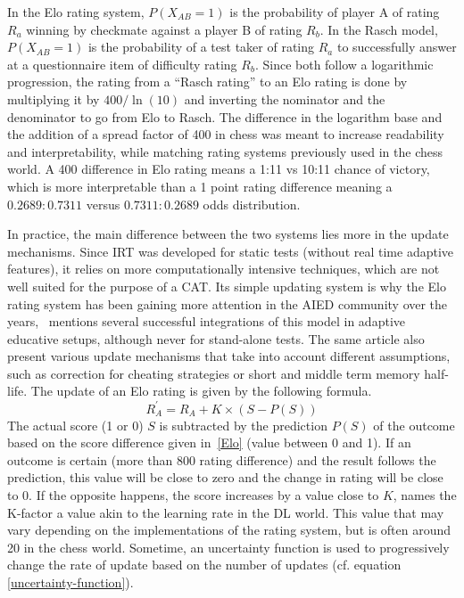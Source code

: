 In the Elo rating system, $P(X_{AB} = 1)$ is the probability of player A of rating $R_a$ winning by checkmate against a player B of rating $R_b$. In the Rasch model, $P(X_{AB} = 1)$ is the probability of a test taker of rating $R_a$ to successfully answer at a questionnaire item of difficulty rating $R_b$. Since both follow a logarithmic progression, the rating from a ``Rasch rating'' to an Elo rating is done by multiplying it by $400/\ln(10)$ and inverting the nominator and the denominator to go from Elo to Rasch. The difference in the logarithm base and the addition of a spread factor of 400 in chess was meant to increase readability and interpretability, while matching rating systems previously used in the chess world. A 400 difference in Elo rating means a 1:11 vs 10:11 chance of victory, which is more interpretable than a 1 point rating difference meaning a $0.2689:0.7311$ versus $0.7311:0.2689$ odds distribution.

In practice, the main difference between the two systems lies more in the update mechanisms. Since IRT was developed for static tests (without real time adaptive features), it relies on more computationally intensive techniques, which are not well suited for the purpose of a CAT\@. Its simple updating system is why the Elo rating system has been gaining more attention in the AIED community over the years,\ \cite{pelanek_applications_2016} mentions several successful integrations of this model in adaptive educative setups, although never for stand-alone tests. The same article also present various update mechanisms that take into account different assumptions, such as correction for cheating strategies or short and middle term memory half-life. The update of an Elo rating is given by the following formula.
\begin{equation}
    R_{A}^{\prime}= R_A+K \times{(S-P(S))}
    \label{Update Elo}
\end{equation}
The actual score (1 or 0) $S$ is subtracted by the prediction $P(S)$ of the outcome based on the score difference given in~\ref{Elo} (value between 0 and 1). If an outcome is certain (more than 800 rating difference) and the result follows the prediction, this value will be close to zero and the change in rating will be close to 0. If the opposite happens, the score increases by a value close to $K$, names the K-factor a value akin to the learning rate in the DL world. This value that may vary depending on the implementations of the rating system, but is often around 20 in the chess world. Sometime, an uncertainty function is used to progressively change the rate of update based on the number of updates (cf. equation \ref{uncertainty-function}).

